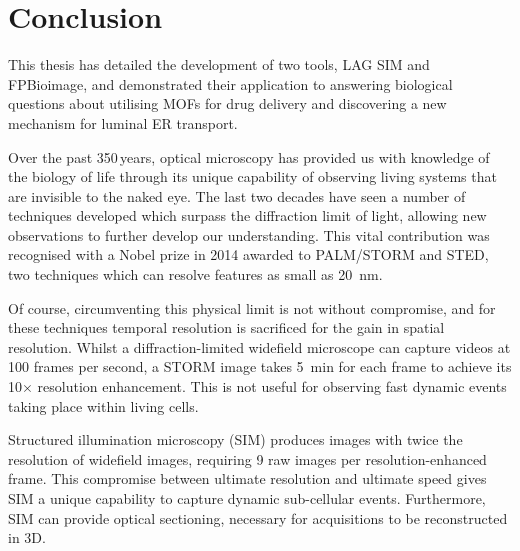 \chapter{Conclusion}
\label{chap:conclusion}


\ifpdf
    \graphicspath{{Chapter6/Figs/Raster/}{Chapter6/Figs/PDF/}{Chapter6/Figs/}}
\else
    \graphicspath{{Chapter6/Figs/Vector/}{Chapter6/Figs/}}
\fi

This thesis has detailed the development of two tools, LAG SIM and FPBioimage, and demonstrated their application to answering biological questions about utilising MOFs for drug delivery and discovering a new mechanism for luminal ER transport. 

Over the past 350\,years, optical microscopy has provided us with knowledge of the biology of life through its unique capability of observing living systems that are invisible to the naked eye. 
The last two decades have seen a number of techniques developed which surpass the diffraction limit of light, allowing new observations to further develop our understanding. 
This vital contribution was recognised with a Nobel prize in 2014 awarded to PALM/STORM and STED, two techniques which can resolve features as small as \SI{20}{\nano\metre}. 

Of course, circumventing this physical limit is not without compromise, and for these techniques temporal resolution is sacrificed for the gain in spatial resolution. 
Whilst a diffraction-limited widefield microscope can capture videos at 100 frames per second, a STORM image takes \SI{5}{\minute} for each frame to achieve its 10$\times$ resolution enhancement. 
This is not useful for observing fast dynamic events taking place within living cells. 

Structured illumination microscopy (SIM) produces images with twice the resolution of widefield images, requiring 9 raw images per resolution-enhanced frame. 
This compromise between ultimate resolution and ultimate speed gives SIM a unique capability to capture dynamic sub-cellular events. 
Furthermore, SIM can provide optical sectioning, necessary for acquisitions to be reconstructed in 3D. 

